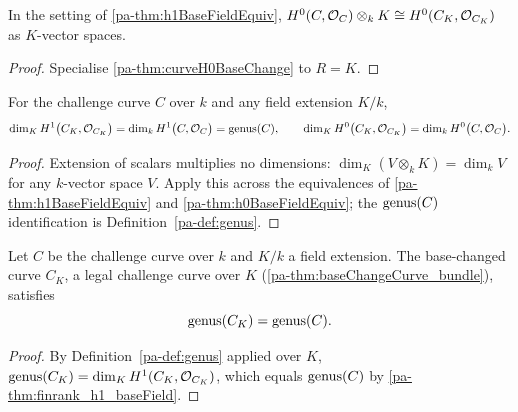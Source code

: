 \begin{theorem}
  \label{pa-thm:h0BaseFieldEquiv}
  \leanok

  In the setting of \ref{pa-thm:h1BaseFieldEquiv},
  \(H^0(C, \mathcal{O}_{C}) \otimes_k K \cong H^0(C_K, \mathcal{O}_{C_K})\) as \(K\)-vector
  spaces.
\end{theorem}
\begin{proof}
  \leanok
  Specialise \ref{pa-thm:curveH0BaseChange} to \(R = K\).
\end{proof}

\begin{theorem}
  \label{pa-thm:finrank_h1_baseField}
  \leanok

  For the challenge curve \(C\) over \(k\) and any field extension \(K/k\),
  \[
    \dim_K H^1\bigl(C_K, \mathcal{O}_{C_K}\bigr) = \dim_k H^1\bigl(C, \mathcal{O}_{C}\bigr)
      = \operatorname{genus}(C),
    \qquad
    \dim_K H^0\bigl(C_K, \mathcal{O}_{C_K}\bigr) = \dim_k H^0\bigl(C, \mathcal{O}_{C}\bigr).
  \]
\end{theorem}
\begin{proof}
  \leanok
  Extension of scalars multiplies no dimensions:
  \(\dim_K(V \otimes_k K) = \dim_k V\) for any \(k\)-vector space \(V\). Apply this
  across the equivalences of \ref{pa-thm:h1BaseFieldEquiv} and \ref{pa-thm:h0BaseFieldEquiv};
  the \(\operatorname{genus}(C)\) identification is Definition~\ref{pa-def:genus}.
\end{proof}

\begin{theorem}
  \label{pa-thm:genus_baseField}
  \leanok

  Let \(C\) be the challenge curve over \(k\) and \(K/k\) a field extension. The
  base-changed curve \(C_K\), a legal challenge curve over \(K\)
  (\ref{pa-thm:baseChangeCurve_bundle}), satisfies
  \[
    \operatorname{genus}(C_K) = \operatorname{genus}(C).
  \]
\end{theorem}
\begin{proof}
  \leanok
  By Definition~\ref{pa-def:genus} applied over \(K\),
  \(\operatorname{genus}(C_K) = \dim_K H^1(C_K, \mathcal{O}_{C_K})\), which equals \(\operatorname{genus}(C)\) by
  \ref{pa-thm:finrank_h1_baseField}.
\end{proof}

